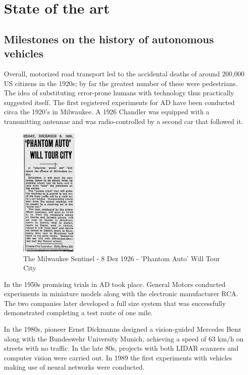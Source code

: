 \chapter{State of the art}

\section{Milestones on the history of autonomous vehicles}

Overall, motorized road transport led to the accidental deaths of around 200,000 US citizens in the 1920s; by far the greatest number of these were pedestrians. \cite{Kroger2016} The idea of substituting error-prone humans with technology thus practically suggested itself. The first registered experiments for AD have been conducted circa the 1920's  \cite{TheMilwaukeeSentinel} in Milwaukee. A 1926 Chandler was equipped with a transmitting antennae and was radio-controlled by a second car that followed it.

\begin{figure}[htp]
	
	\centering
	\includegraphics[width=0.25\textwidth]{capstate/imgs/jornal.png}
	
	\caption{The Milwaukee Sentinel - 8 Dez 1926 - 'Phantom Auto' Will Tour City}
	\label{fig:waymo}
	
\end{figure}

In the 1950s promising trials in AD took place. General Motors conducted experiments in miniature models along with the electronic manufacturer RCA. The two companies later developed a full size system that was successfully demonstrated completing a test route of one mile.  \cite{Kroger2016}

In the 1980s, pioneer Ernst Dickmanns designed a vision-guided Mercedes Benz along with the Bundeswehr University Munich, achieving a speed of 63 km/h on streets with no traffic. In the late 80s, projects with both LIDAR scanners and computer vision were carried out. In 1989 the first experiments with vehicles making use of neural networks were conducted. \cite{Pomerleau1989}

